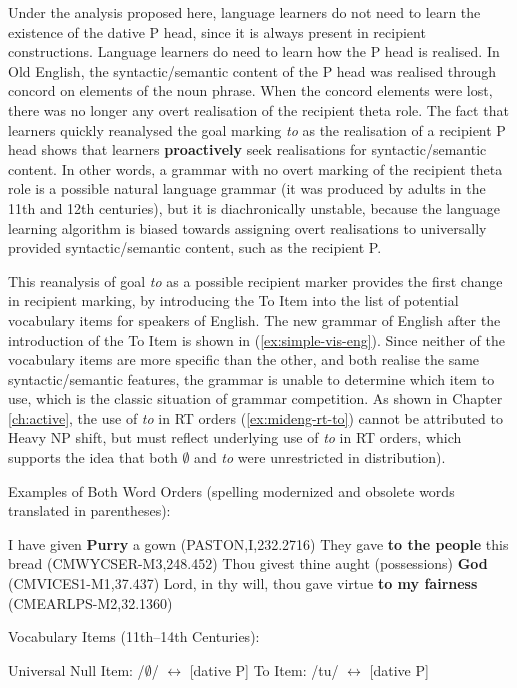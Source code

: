 	Under the analysis proposed here, language learners do not need to learn the existence of the dative P head, since it is always present in recipient constructions. Language learners do need to learn how the P head is realised. In Old English, the syntactic/semantic content of the P head was realised through concord on elements of the noun phrase. When the concord elements were lost, there was no longer any overt realisation of the recipient theta role. The fact that learners quickly reanalysed the goal marking \textit{to} as the realisation of a recipient P head shows that learners \textbf{proactively} seek realisations for syntactic/semantic content. In other words, a grammar with no overt marking of the recipient theta role is a possible natural language grammar (it was produced by adults in the 11th and 12th centuries), but it is diachronically unstable, because the language learning algorithm is biased towards assigning overt realisations to universally provided syntactic/semantic content, such as the recipient P.

	This reanalysis of goal \textit{to} as a possible recipient marker provides the first change in recipient marking, by introducing the To Item into the list of potential vocabulary items for speakers of English. The new grammar of English after the introduction of the To Item is shown in (\ref{ex:simple-vis-eng}). Since neither of the vocabulary items are more specific than the other, and both realise the same syntactic/semantic features, the grammar is unable to determine which item to use, which is the classic situation of grammar competition. As shown in Chapter \ref{ch:active}, the use of \textit{to} in RT orders (\ref{ex:mideng-rt-to}) cannot be attributed to Heavy NP shift, but must reflect underlying use of \textit{to} in RT orders, which supports the idea that both $\emptyset$ and \textit{to} were unrestricted in distribution). 
	\begin{exe}
		\ex Examples of Both Word Orders (spelling modernized and obsolete words translated in parentheses):
		\begin{xlist}
			\ex I have given \textbf{Purry} a gown (PASTON,I,232.2716)
			\ex They gave \textbf{to the people} this bread (CMWYCSER-M3,248.452)\label{ex:mideng-rt-to}
			\ex Thou givest thine aught (possessions) \textbf{God} (CMVICES1-M1,37.437)
			\ex Lord, in thy will, thou gave virtue \textbf{to my fairness} (CMEARLPS-M2,32.1360)
		\end{xlist}
		\ex Vocabulary Items (11th--14th Centuries):\label{ex:simple-vis-eng}
		\begin{xlist}
			\ex Universal Null Item: /$\emptyset$/ $\leftrightarrow$ [dative P]
			\ex To Item: /tu/ $\leftrightarrow$ [dative P]
		\end{xlist}
	\end{exe}

